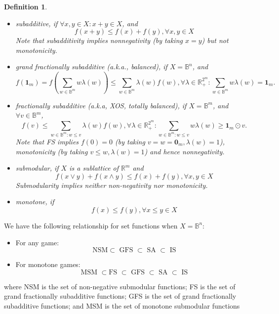 \documentclass[11pt]{article}\usepackage[]{graphicx}\usepackage[]{xcolor}
\newtheorem{deff}{Definition}
\begin{document}
\begin{deff}
\begin{itemize}
\item subadditive, if $\forall x, y\in X: x+y\in X$, and 
\begin{equation}\label{deff:subadd}
f(x+y)\le f(x)+f(y), \forall x, y\in X
\end{equation}
Note that subadditivity implies nonnegativity (by taking $x=y$) but not monotonicity. 
\item grand fractionally subadditive (a.k.a., balanced), if $X=\mathbb{B}^n$, and 
\begin{equation}\label{deff:gfis}
f\left(\mathbf{1}_m\right)=f\left(\sum_{w\in \mathbb{B}^m} w \lambda(w)\right)\le \sum_{w\in \mathbb{B}^m} \lambda(w) f\left(w\right), \forall \lambda \in \mathbb{R}^{2^m}_{+}: \sum_{w\in \mathbb{B}^m} w \lambda(w)=\mathbf{1}_m.
\end{equation}
\item fractionally subadditive (a.k.a, XOS, totally balanced), if $X=\mathbb{B}^m$, and $\forall v\in\mathbb{B}^m$, 
\begin{equation}\label{deff:gfis}
f(v)\le \sum_{w\in \mathbb{B}^m: w\le v} \lambda(w) f\left(w\right), \forall \lambda \in \mathbb{R}^{2^m}_{+}: \sum_{w\in \mathbb{B}^m: w\le v} w \lambda(w)\ge \mathbf{1}_m\odot v.
\end{equation}
Note that FS implies $f(0)=0$ (by taking $v=w=\mathbf{0}_m, \lambda(w)=1$), monotonicity (by taking $v\le w, \lambda(w)=1$) and hence nonnegativity. 
\item submodular, if $X$ is a sublattice of $\mathbb{R}^m$ and 
\begin{equation}\label{deff:gfis}
f(x\vee y)+f(x\wedge y)\le f(x)+f(y), \forall x, y\in X
\end{equation}
Submodularity implies neither non-negativity nor monotonicity.
\item monotone, if 
\[
f(x)\le f(y), \forall x\le y\in X
\]
\end{itemize}
\end{deff}



We have the following relationship for set functions when $X=\mathbb{B}^n$:
\begin{itemize}
\item For any game:
\[
\text{NSM}\subset \text{ GFS } \subset \text{ SA }\subset \text{ IS}
\]
\item For monotone games:
\[
\text{MSM }\subset \text{FS }\subset \text{ GFS } \subset \text{ SA }\subset \text{ IS}
\]
\end{itemize}
where NSM is the set of non-negative submodular functions; FS is the set of grand fractionally subadditive functions; GFS is the set of grand fractionally subadditive functions; and MSM is the set of monotone submodular functions
\end{document}
